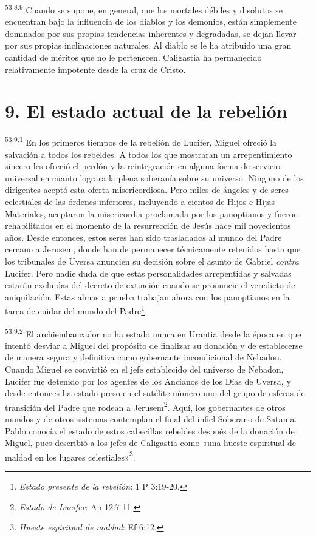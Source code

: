 \par
\textsuperscript{53:8.9} Cuando se supone, en general, que los mortales débiles y disolutos se encuentran bajo la influencia de los diablos y los demonios, están simplemente dominados por sus propias tendencias inherentes y degradadas, se dejan llevar por sus propias inclinaciones naturales. Al diablo se le ha atribuido una gran cantidad de méritos que no le pertenecen. Caligastia ha permanecido relativamente impotente desde la cruz de Cristo.

\section*{9. El estado actual de la rebelión}
\par
\textsuperscript{53:9.1} En los primeros tiempos de la rebelión de Lucifer, Miguel ofreció la salvación a todos los rebeldes. A todos los que mostraran un arrepentimiento sincero les ofreció el perdón y la reintegración en alguna forma de servicio universal en cuanto lograra la plena soberanía sobre su universo. Ninguno de los dirigentes aceptó esta oferta misericordiosa. Pero miles de ángeles y de seres celestiales de las órdenes inferiores, incluyendo a cientos de Hijos e Hijas Materiales, aceptaron la misericordia proclamada por los panoptianos y fueron rehabilitados en el momento de la resurrección de Jesús hace mil novecientos años. Desde entonces, estos seres han sido trasladados al mundo del Padre cercano a Jerusem, donde han de permanecer técnicamente retenidos hasta que los tribunales de Uversa anuncien su decisión sobre el asunto de Gabriel \textit{contra} Lucifer. Pero nadie duda de que estas personalidades arrepentidas y salvadas estarán excluidas del decreto de extinción cuando se pronuncie el veredicto de aniquilación. Estas almas a prueba trabajan ahora con los panoptianos en la tarea de cuidar del mundo del Padre\footnote{\textit{Estado presente de la rebelión}: 1 P 3:19-20.}.

\par
\textsuperscript{53:9.2} El archiembaucador no ha estado nunca en Urantia desde la época en que intentó desviar a Miguel del propósito de finalizar su donación y de establecerse de manera segura y definitiva como gobernante incondicional de Nebadon. Cuando Miguel se convirtió en el jefe establecido del universo de Nebadon, Lucifer fue detenido por los agentes de los Ancianos de los Días de Uversa, y desde entonces ha estado preso en el satélite número uno del grupo de esferas de transición del Padre que rodean a Jerusem\footnote{\textit{Estado de Lucifer}: Ap 12:7-11.}. Aquí, los gobernantes de otros mundos y de otros sistemas contemplan el final del infiel Soberano de Satania. Pablo conocía el estado de estos cabecillas rebeldes después de la donación de Miguel, pues describió a los jefes de Caligastia como «una hueste espiritual de maldad en los lugares celestiales»\footnote{\textit{Hueste espiritual de maldad}: Ef 6:12.}.

